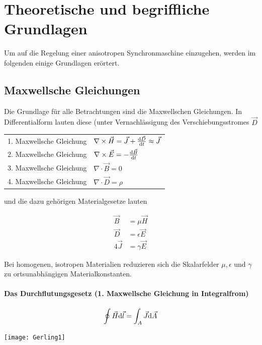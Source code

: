 
\chapter{Theoretische und begriffliche Grundlagen}\label{cha:grundlagen}

Um auf die Regelung einer anisotropen Synchronmaschine einzugehen, werden im folgenden einige Grundlagen erörtert.

\section{Maxwellsche Gleichungen}\label{sec:maxwell}

Die Grundlage für alle Betrachtungen sind die Maxwellschen Gleichungen.
In Differentialform lauten diese (unter Vernachlässigung des Verschiebungsstromes $\vec{D}$

\begin{tabular}{ll}
1. Maxwellsche Gleichung	&	$\nabla \times \vec{H} = \vec{J}+\frac{\mathrm{d}\vec{D}}{\mathrm{d}t} \approx \vec{J}$ \\
2. Maxwellsche Gleichung	&	$\nabla \times \vec{E} = -\frac{\mathrm{d}\vec{B}}{\mathrm{d}t}$ \\
3. Maxwellsche Gleichung	&	$\nabla \cdot \vec{B} = 0$ \\
4. Maxwellsche Gleichung	&	$\nabla \cdot \vec{D} = \rho$
\end{tabular}

und die dazu gehörigen Materialgesetze lauten

\begin{align*}
\vec{B} &= \mu\vec{H}\\
\vec{D}	&= \epsilon\vec{E}\\4
\vec{J} &= \gamma\vec{E}
\end{align*}

Bei homogenen, isotropen Materialien reduzieren sich die Skalarfelder $\mu, \epsilon$ und $\gamma$ zu ortsunabhängigen Materialkonstanten.

\subsubsection{Das Durchflutungsgesetz (1. Maxwellsche Gleichung in Integralfrom)}

\begin{minipage}{0.5\textwidth}
	\begin{align}
		\oint \vec{H}\mathrm{d}\vec{l} = \int_A \vec{J}\mathrm{d}\vec{A}
	\end{align}
\end{minipage}
\begin{minipage}{0.5\textwidth}
	\texttt{[image: Gerling1]}
\end{minipage}

